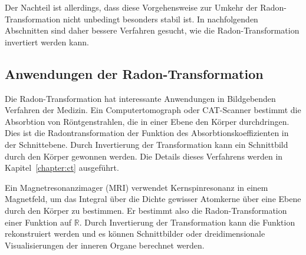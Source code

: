 Der Nachteil ist allerdings, dass diese Vorgehensweise zur Umkehr der
Radon-Transformation nicht unbedingt besonders stabil ist.
In nachfolgenden Abschnitten sind daher bessere Verfahren gesucht,
wie die Radon-Transformation invertiert werden kann.

%
%
\subsection{Anwendungen der Radon-Transformation
\label{buch:radon:definition:subsection:anwendungen}}
Die Radon-Transformation hat interessante Anwendungen in Bildgebenden
Verfahren der Medizin.
Ein Computertomograph oder CAT-Scanner bestimmt die Absorbtion von
Röntgenstrahlen, die in einer Ebene den Körper durchdringen.
Dies ist die Radontransformation der Funktion des Absorbtionskoeffizienten
in der Schnittebene.
Durch Invertierung der Transformation kann ein Schnittbild durch
den Körper gewonnen werden.
Die Details dieses Verfahrens werden in Kapitel~\ref{chapter:ct}
ausgeführt.

Ein Magnetresonanzimager (MRI) verwendet Kernspinresonanz in einem Magnetfeld,
um das Integral über die Dichte gewisser Atomkerne über eine Ebene durch
den Körper zu bestimmen.
Er bestimmt also die Radon-Transformation einer Funktion auf $\mathbb{R}$.
Durch Invertierung der Transformation kann die Funktion rekonstruiert werden
und es können Schnittbilder oder dreidimensionale Visualisierungen
der inneren Organe berechnet werden.


